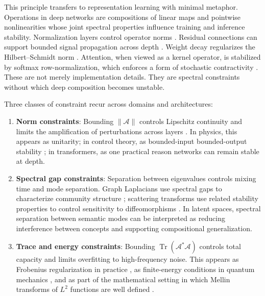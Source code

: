 This principle transfers to representation learning with minimal metaphor. Operations in deep networks are compositions of linear maps and pointwise nonlinearities whose joint spectral properties influence training and inference stability. Normalization layers control operator norms \cite{xiong2020layer}. Residual connections can support bounded signal propagation across depth \cite{he2016deep}. Weight decay regularizes the Hilbert--Schmidt norm \cite{krogh1991simple}. Attention, when viewed as a kernel operator, is stabilized by softmax row-normalization, which enforces a form of stochastic contractivity \cite{dong2021attention}. These are not merely implementation details. They are spectral constraints without which deep composition becomes unstable.

Three classes of constraint recur across domains and architectures:

\begin{enumerate}
\item \textbf{Norm constraints}: Bounding $\|\mathcal{A}\|$ controls Lipschitz continuity and limits the amplification of perturbations across layers \cite{miyato2018spectral}. In physics, this appears as unitarity; in control theory, as bounded-input bounded-output stability \cite{khalil2002nonlinear}; in transformers, as one practical reason networks can remain stable at depth.

\item \textbf{Spectral gap constraints}: Separation between eigenvalues controls mixing time and mode separation. Graph Laplacians use spectral gaps to characterize community structure \cite{chung1997spectral}; scattering transforms use related stability properties to control sensitivity to diffeomorphisms \cite{mallat2012group}. In latent spaces, spectral separation between semantic modes can be interpreted as reducing interference between concepts and supporting compositional generalization.

\item \textbf{Trace and energy constraints}: Bounding $\operatorname{Tr}(\mathcal{A}^{*}\mathcal{A})$ controls total capacity and limits overfitting to high-frequency noise. This appears as Frobenius regularization in practice \cite{neyshabur2015norm}, as finite-energy conditions in quantum mechanics \cite{reed1980methods}, and as part of the mathematical setting in which Mellin transforms of $L^2$ functions are well defined \cite{titchmarsh1948introduction}.
\end{enumerate}

